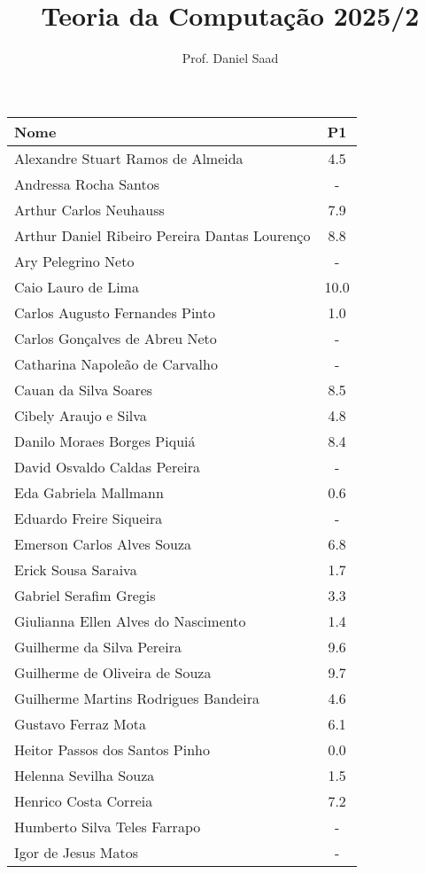 \documentclass{article}
\title{ Teoria da Computação 2025/2}
\date{}
\author{ Prof. Daniel Saad}
\begin{document}
 \maketitle
    \begin{longtable}{|l|c|}
    \hline
Nome & P1\\\hline \endhead   
Alexandre Stuart Ramos de Almeida & 4.5\\\hline
Andressa Rocha Santos & -\\\hline
Arthur Carlos Neuhauss & 7.9\\\hline
Arthur Daniel Ribeiro Pereira Dantas Lourenço & 8.8\\\hline
Ary Pelegrino Neto & -\\\hline
Caio Lauro de Lima & 10.0\\\hline
Carlos Augusto Fernandes Pinto & 1.0\\\hline
Carlos Gonçalves de Abreu Neto & -\\\hline
Catharina Napoleão de Carvalho & -\\\hline
Cauan da Silva Soares & 8.5\\\hline
Cibely Araujo e Silva & 4.8\\\hline
Danilo Moraes Borges Piquiá & 8.4\\\hline
David Osvaldo Caldas Pereira & -\\\hline
Eda Gabriela Mallmann & 0.6\\\hline
Eduardo Freire Siqueira & -\\\hline
Emerson Carlos Alves Souza & 6.8\\\hline
Erick Sousa Saraiva & 1.7\\\hline
Gabriel Serafim Gregis & 3.3\\\hline
Giulianna Ellen Alves do Nascimento & 1.4\\\hline
Guilherme da Silva Pereira & 9.6\\\hline
Guilherme de Oliveira de Souza & 9.7\\\hline
Guilherme Martins Rodrigues Bandeira & 4.6\\\hline
Gustavo Ferraz Mota & 6.1\\\hline
Heitor Passos dos Santos Pinho & 0.0\\\hline
Helenna Sevilha Souza & 1.5\\\hline
Henrico Costa Correia & 7.2\\\hline
Humberto Silva Teles Farrapo & -\\\hline
Igor de Jesus Matos & -\\\hline

\end{longtable}
\end{document}
